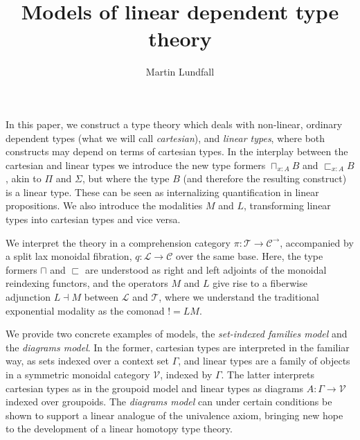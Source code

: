 
\usepackage[margin=0.5in]{geometry}
\usepackage{todonotes}
\newtheorem{lemm}[thm]{Lemma}
\newtheorem{remrk}[thm]{Remark}
\newtheorem{corl}[thm]{Corollary}
\newtheorem{expl}[thm]{Example}
\newtheorem{hyp}[thm]{Hypothesis}

\title{Models of linear dependent type theory}
\author{Martin Lundfall}
\maketitle
\abstract
In this paper, we construct a type theory which deals with non-linear, ordinary dependent types (what we will call \textit{cartesian}), and \textit{linear types}, where both constructs may depend on terms of cartesian types. In the interplay between the cartesian and linear types we introduce the new type formers $\sqcap_{x : A}B$ and $\sqsubset_{x : A}B$, akin to $\Pi$ and $\Sigma$, but where the type $B$ (and therefore the resulting construct) is a linear type. These can be seen as internalizing quantification in linear propositions. We also introduce the modalities $M$ and $L$, transforming linear types into cartesian types and vice versa.

We interpret the theory in a comprehension category $\pi : \mathcal{T} \to \mathcal{C}^\to$, accompanied by a split lax monoidal fibration, $q : \mathcal{L} \to \mathcal{C}$ over the same base. Here, the type formers $\sqcap$ and $\sqsubset$ are understood as right and left adjoints of the monoidal reindexing functors, and the operators $M$ and $L$ give rise to a fiberwise adjunction $L \dashv M$ between $\mathcal{L}$ and $\mathcal{T}$, where we understand the traditional exponential modality as the comonad $! = LM$.

We provide two concrete examples of models, the \textit{set-indexed families model} and the \textit{diagrams model}. In the former, cartesian types are interpreted in the familiar way, as sets indexed over a context set $\Gamma$, and linear types are a family of objects in a symmetric monoidal category $\mathcal{V}$, indexed by $\Gamma$. The latter interprets cartesian types as in the groupoid model and linear types as diagrams $A : \Gamma \to \mathcal{V}$ indexed over groupoids. The \textit{diagrams model} can under certain conditions be shown to support a linear analogue of the univalence axiom, bringing new hope to the development of a linear homotopy type theory.
\newpage
\tableofcontents
\newpage

